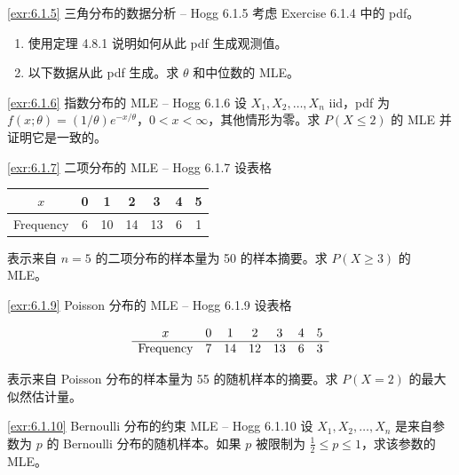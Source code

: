 \begin{exercise}{\ref{exr:6.1.5} 三角分布的数据分析 – Hogg 6.1.5}\label{exr:6.1.5}
考虑 Exercise 6.1.4 中的 pdf。

\begin{enumerate}
\item[(a)] 使用定理 4.8.1 说明如何从此 pdf 生成观测值。
\item[(b)] 以下数据从此 pdf 生成。求 $\theta$ 和中位数的 MLE。
\end{enumerate}
\end{exercise}

\begin{exercise}{\ref{exr:6.1.6} 指数分布的 MLE – Hogg 6.1.6}\label{exr:6.1.6}
设 $X_1, X_2, \ldots, X_n$ iid，pdf 为 $f(x;\theta) = (1/\theta)e^{-x/\theta}$，$0 < x < \infty$，其他情形为零。求 $P(X \leq 2)$ 的 MLE 并证明它是一致的。
\end{exercise}

\begin{exercise}{\ref{exr:6.1.7} 二项分布的 MLE – Hogg 6.1.7}\label{exr:6.1.7}
设表格

\begin{center}
\begin{tabular}{c|cccccc}
$x$ & 0 & 1 & 2 & 3 & 4 & 5 \\ \hline
Frequency & 6 & 10 & 14 & 13 & 6 & 1
\end{tabular}
\end{center}

表示来自 $n=5$ 的二项分布的样本量为 50 的样本摘要。求 $P(X \geq 3)$ 的 MLE。
\end{exercise}

\begin{exercise}{\ref{exr:6.1.9} Poisson 分布的 MLE – Hogg 6.1.9}\label{exr:6.1.9}
设表格

\[
\begin{array}{c c c c c c c}
x & 0 & 1 & 2 & 3 & 4 & 5 \\ \hline
\text{Frequency} & 7 & 14 & 12 & 13 & 6 & 3
\end{array}
\]

表示来自 Poisson 分布的样本量为 55 的随机样本的摘要。求 $P(X=2)$ 的最大似然估计量。
\end{exercise}

\begin{exercise}{\ref{exr:6.1.10} Bernoulli 分布的约束 MLE – Hogg 6.1.10}\label{exr:6.1.10}
设 $X_1, X_2, \ldots, X_n$ 是来自参数为 $p$ 的 Bernoulli 分布的随机样本。如果 $p$ 被限制为 $\frac{1}{2} \leq p \leq 1$，求该参数的 MLE。
\end{exercise}


